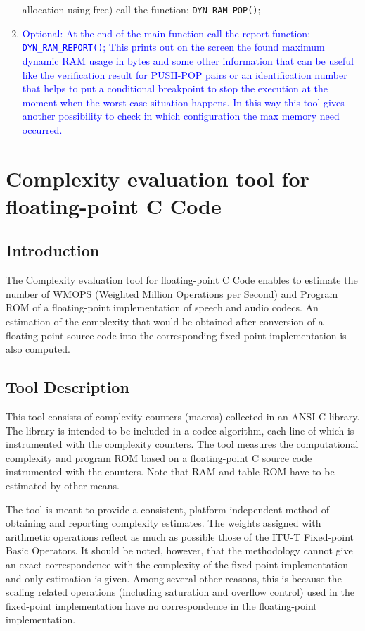 \begin{enumerate}
{  allocation using free) call the function: {\tt DYN\_RAM\_POP()};
}
\item \textcolor{blue}{%
  Optional: At the end of the main function call the report
  function: {\tt DYN\_RAM\_REPORT()}; This prints out on the screen
  the found maximum dynamic RAM usage in bytes and some other
  information that can be useful like the verification result for
  PUSH-POP pairs or an identification number that helps to put a
  conditional breakpoint to stop the execution at the moment when the
  worst case situation happens. In this way this tool gives another
  possibility to check in which configuration the max memory need
  occurred.
}
\end{enumerate}

\section{Complexity evaluation tool for floating-point C Code}

\subsection{Introduction}
The Complexity evaluation tool for floating-point C Code enables to 
estimate the number of WMOPS (Weighted Million Operations per Second) 
and Program ROM of a floating-point implementation of speech and audio 
codecs. An estimation of the complexity that would be obtained 
after conversion of a floating-point source code into the corresponding 
fixed-point implementation is also computed.

\subsection{Tool Description }
This tool consists of complexity counters (macros) collected in an ANSI 
C library. The library is intended to be included in a codec algorithm, 
each line of which is instrumented with the complexity counters. The 
tool measures the computational complexity and program ROM based on a 
floating-point C source code instrumented with the counters. Note that 
RAM and table ROM have to be estimated by other means. 

The tool is meant to provide a consistent, platform independent method 
of obtaining and reporting complexity estimates. The weights assigned 
with arithmetic operations reflect as much as possible those of the 
ITU-T Fixed-point Basic Operators. It should be noted, however, that the methodology 
cannot give an exact correspondence with the complexity of the fixed-point implementation and only estimation is given. Among several other 
reasons, this is because the scaling related operations (including 
saturation and overflow control) used in the fixed-point implementation 
have no correspondence in the floating-point implementation.

